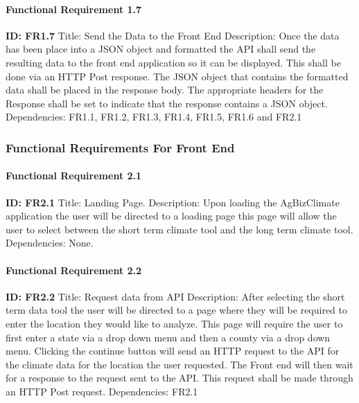 \documentclass[onecolumn, draftclsnofoot,10pt, compsoc]{article}
\begin{document}
					\paragraph{Functional Requirement 1.7}
						\textbf{ID: FR1.7}\newline
						Title: Send the Data to the Front End\newline
						Description: Once the data has been place into a JSON object and formatted the API shall send the resulting data to the front end application so it can be displayed. This shall be done via an HTTP Post response. The JSON object that contains the formatted data shall be placed in the response body. The appropriate headers for the Response shall be set to indicate that the response contains a JSON object.\newline
						Dependencies: FR1.1, FR1.2, FR1.3, FR1.4, FR1.5, FR1.6 and FR2.1\newline
			
			\subsubsection{Functional Requirements For Front End}
				\paragraph{Functional Requirement 2.1}
					\textbf{ID: FR2.1}\newline
					Title: Landing Page.\newline
					Description: Upon loading the AgBizClimate application the user will be directed to a loading page this page will allow the user to select between the short term climate tool and the long term climate tool.\newline
					Dependencies: None.\newline
					
				\paragraph{Functional Requirement 2.2}
					\textbf{ID: FR2.2}\newline
					Title: Request data from API\newline
					Description: After selecting the short term data tool the user will be directed to a page where they will be required to enter the location they would like to analyze. This page will require the user to first enter a state via a drop down menu and then a county via a drop down menu. Clicking the continue button will send an HTTP request to the API for the climate data for the location the user requested. The Front end will then wait for a response to the request sent to the API. This request shall be made through an HTTP Post request.\newline
					Dependencies: FR2.1\newline
				
\end{document}
